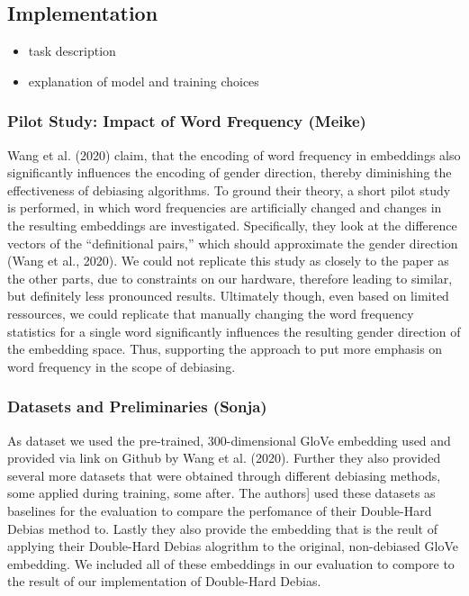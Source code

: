 \documentclass[
  english,
  man,floatsintext]{apa6}
\providecommand{\tightlist}{%
  \setlength{\itemsep}{0pt}\setlength{\parskip}{0pt}}
\begin{document}
\hypertarget{implementation}{%
\subsection{Implementation}\label{implementation}}

\begin{itemize}
\tightlist
\item
  task description
\item
  explanation of model and training choices
\end{itemize}

\hypertarget{pilot-study-impact-of-word-frequency-meike}{%
\subsubsection{Pilot Study: Impact of Word Frequency (Meike)}\label{pilot-study-impact-of-word-frequency-meike}}

Wang et al. (2020) claim, that the encoding of word frequency in embeddings also significantly influences the encoding of gender direction, thereby diminishing the effectiveness of debiasing algorithms. To ground their theory, a short pilot study is performed, in which word frequencies are artificially changed and changes in the resulting embeddings are investigated.
Specifically, they look at the difference vectors of the ``definitional pairs,'' which should approximate the gender direction (Wang et al., 2020).
We could not replicate this study as closely to the paper as the other parts, due to constraints on our hardware, therefore leading to similar, but definitely less pronounced results. Ultimately though, even based on limited ressources, we could replicate that manually changing the word frequency statistics for a single word significantly influences the resulting gender direction of the embedding space. Thus, supporting the approach to put more emphasis on word frequency in the scope of debiasing.

\hypertarget{datasets-and-preliminaries-sonja}{%
\subsubsection{Datasets and Preliminaries (Sonja)}\label{datasets-and-preliminaries-sonja}}

As dataset we used the pre-trained, 300-dimensional GloVe embedding used and provided via link on Github by Wang et al. (2020). Further they also provided several more datasets that were obtained through different debiasing methods, some applied during training, some after. The authors{]} used these datasets as baselines for the evaluation to compare the perfomance of their Double-Hard Debias method to. Lastly they also provide the embedding that is the reult of applying their Double-Hard Debias alogrithm to the original, non-debiased GloVe embedding. We included all of these embeddings in our evaluation to compore to the result of our implementation of Double-Hard Debias.
\end{document}
